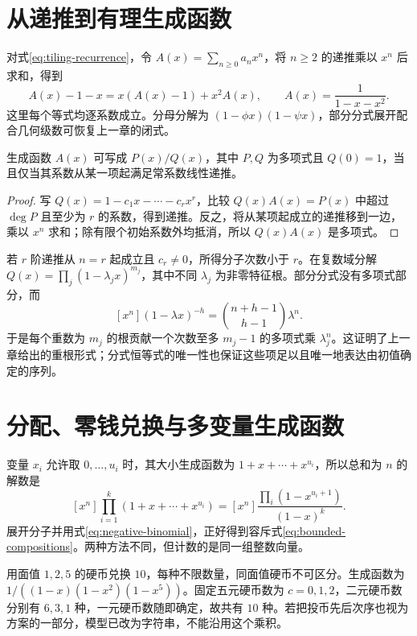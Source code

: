 \documentclass[UTF8,12pt,a4paper,fontset=fandol]{ctexbook}
\begin{document}
\section{从递推到有理生成函数}

对式\eqref{eq:tiling-recurrence}，令 $A(x)=\sum_{n\ge0}a_nx^n$，将 $n\ge2$ 的递推乘以 $x^n$ 后求和，得到
\[
 A(x)-1-x=x(A(x)-1)+x^2A(x),\qquad
 A(x)=\frac{1}{1-x-x^2}.
\]
这里每个等式均逐系数成立。分母分解为 $(1-\phi x)(1-\psi x)$，部分分式展开配合几何级数可恢复上一章的闭式。

\begin{proposition}
生成函数 $A(x)$ 可写成 $P(x)/Q(x)$，其中 $P,Q$ 为多项式且 $Q(0)=1$，当且仅当其系数从某一项起满足常系数线性递推。
\end{proposition}
\begin{proof}
写 $Q(x)=1-c_1x-\cdots-c_rx^r$，比较 $Q(x)A(x)=P(x)$ 中超过 $\deg P$ 且至少为 $r$ 的系数，得到递推。反之，将从某项起成立的递推移到一边，乘以 $x^n$ 求和；除有限个初始系数外均抵消，所以 $Q(x)A(x)$ 是多项式。
\end{proof}

若 $r$ 阶递推从 $n=r$ 起成立且 $c_r\ne0$，所得分子次数小于 $r$。在复数域分解 $Q(x)=\prod_j(1-\lambda_jx)^{m_j}$，其中不同 $\lambda_j$ 为非零特征根。部分分式没有多项式部分，而
\[
 [x^n](1-\lambda x)^{-h}=\binom{n+h-1}{h-1}\lambda^n.
\]
于是每个重数为 $m_j$ 的根贡献一个次数至多 $m_j-1$ 的多项式乘 $\lambda_j^n$。这证明了上一章给出的重根形式；分式恒等式的唯一性也保证这些项足以且唯一地表达由初值确定的序列。

\section{分配、零钱兑换与多变量生成函数}

变量 $x_i$ 允许取 $0,\ldots,u_i$ 时，其大小生成函数为 $1+x+\cdots+x^{u_i}$，所以总和为 $n$ 的解数是
\[
 [x^n]\prod_{i=1}^k(1+x+\cdots+x^{u_i})
 =[x^n]\frac{\prod_i(1-x^{u_i+1})}{(1-x)^k}.
\]
展开分子并用式\eqref{eq:negative-binomial}，正好得到容斥式\eqref{eq:bounded-compositions}。两种方法不同，但计数的是同一组整数向量。

\begin{example}[零钱兑换]
用面值 $1,2,5$ 的硬币兑换 $10$，每种不限数量，同面值硬币不可区分。生成函数为 $1/((1-x)(1-x^2)(1-x^5))$。固定五元硬币数为 $c=0,1,2$，二元硬币数分别有 $6,3,1$ 种，一元硬币数随即确定，故共有 $10$ 种。若把投币先后次序也视为方案的一部分，模型已改为字符串，不能沿用这个乘积。
\end{example}
\end{document}
